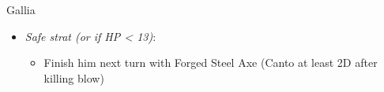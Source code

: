 \begin{battle}{Gallia}
\begin{multicols}{2}
\begin{enumerate}
{\begin{itemize}
\begin{itemize}
	\end{itemize}
       \item \textit{Safe strat (or if HP < 13)}:
        \begin{itemize}
            \item Finish him next turn with Forged Steel Axe (Canto at least 2D after killing blow)
            \end{itemize}
    \end{itemize}
    \turnend
}
\end{enumerate}
\end{multicols}
\end{battle}